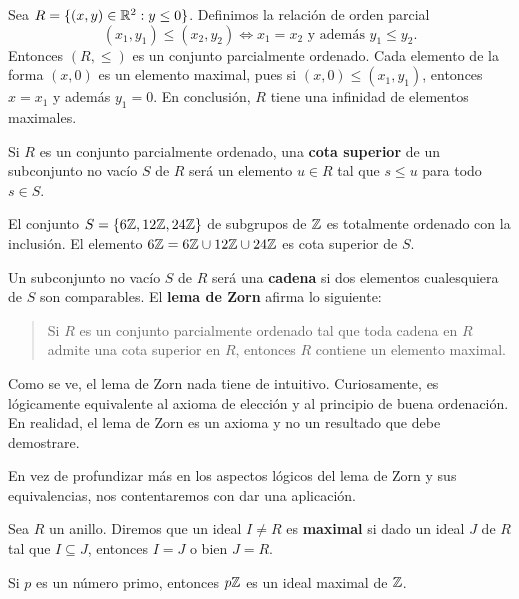 \begin{example}
Sea $R=\{(x,y)\in\mathbb{R}^2:y\leq 0\}$. Definimos la relación de orden parcial 
\[
(x_1,y_1)\leq (x_2,y_2)\Longleftrightarrow x_1=x_2\text{ y además }y_1\leq y_2.
\]
Entonces $(R,\leq)$ es un conjunto parcialmente ordenado. Cada elemento de la forma $(x,0)$ 
es un elemento maximal, pues si $(x,0)\leq (x_1,y_1)$, entonces $x=x_1$ y además $y_1=0$. En conclusión, $R$ tiene
una infinidad de elementos maximales. 	
\end{example}


Si $R$ es un conjunto parcialmente ordenado, una \textbf{cota superior} de un subconjunto no vacío $S$ de $R$ 
será un elemento $u\in R$ tal que $s\leq u$ para todo $s\in S$. 


\begin{example}
El conjunto $S=\{6\mathbb{Z},12\mathbb{Z},24\mathbb{Z}\}$ de subgrupos de $\mathbb{Z}$ 
es totalmente ordenado con la inclusión. El elemento $6\mathbb{Z}=6\mathbb{Z}\cup 12\mathbb{Z}\cup 24\mathbb{Z}$ es
cota superior de $S$. 	
\end{example}

Un subconjunto no vacío $S$ de $R$ 
será una \textbf{cadena} si dos elementos cualesquiera de $S$ son comparables. El \textbf{lema de Zorn} 
afirma lo siguiente:


\begin{quote}
Si $R$ es un conjunto parcialmente ordenado tal que 
toda cadena en $R$ admite una cota superior en $R$, entonces
$R$ contiene un elemento maximal.	
\end{quote}

Como se ve, el lema de Zorn nada tiene de intuitivo. Curiosamente, es lógicamente equivalente al axioma de elección y al principio de buena ordenación. 
En realidad, el lema 
de Zorn es un axioma y no un resultado que debe demostrare. 

En vez de profundizar más en los aspectos lógicos del lema de Zorn y sus equivalencias, nos contentaremos con dar una aplicación.

\begin{definition}
	Sea $R$ un anillo. Diremos que un ideal $I\ne R$ es \textbf{maximal} si dado un ideal $J$ de $R$ tal que 
	$I\subseteq J$, entonces $I=J$ o bien $J=R$.  
\end{definition}

\begin{example}
Si $p$ es un número primo, entonces $p\mathbb{Z}$ es un ideal maximal de $\mathbb{Z}$.
\end{example}

